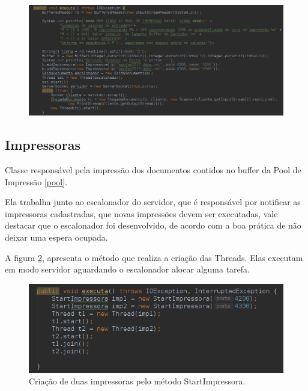 \documentclass[12pt]{article}
\begin{document}
\begin{figure}[h]
	\centering
	\includegraphics[width=1\linewidth]{imagens/screenshot017}
	\caption{}
	\label{fig:screenshot006}
\end{figure}






\subsection{Impressoras}\label{impre}
Classe responsável pela impressão dos documentos contidos  no buffer da Pool de Impressão \ref{pool}.

Ela trabalha junto ao escalonador do servidor, que é responsável por notificar as impressoras cadastradas, que novas impressões devem ser executadas, vale destacar que o escalonador foi desenvolvido, de acordo com a boa prática de não deixar uma espera ocupada.

A figura \ref{fig:screenshot002}, apresenta o método que realiza a criação das Threads.
Elas executam em modo servidor aguardando o escalonador alocar alguma tarefa.
\begin{figure}[h]
	\centering
	\includegraphics[width=1\linewidth]{imagens/screenshot002}
	\caption{Criação de duas impressoras pelo método StartImpressora.}
	\label{fig:screenshot002}
\end{figure}
\end{document}
